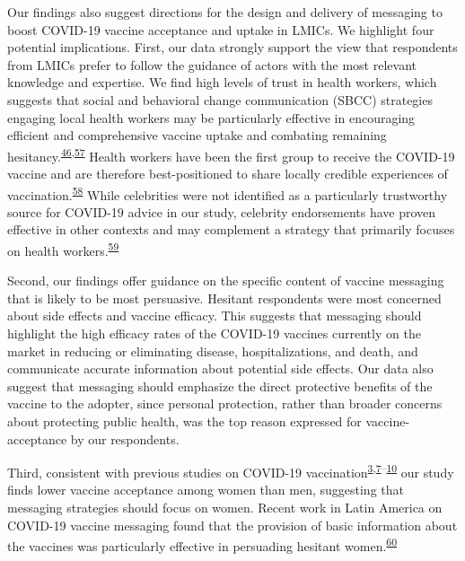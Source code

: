 \documentclass[
  12pt,
]{article}
\begin{document}
Our findings also suggest directions for the design and delivery of messaging to boost COVID-19 vaccine acceptance and uptake in LMICs. We highlight four potential implications. First, our data strongly support the view that respondents from LMICs prefer to follow the guidance of actors with the most relevant knowledge and expertise. We find high levels of trust in health workers, which suggests that social and behavioral change communication (SBCC) strategies engaging local health workers may be particularly effective in encouraging efficient and comprehensive vaccine uptake and combating remaining hesitancy.\textsuperscript{\protect\hyperlink{ref-bokemper2021timing}{46},\protect\hyperlink{ref-who2020behavioral}{57}} Health workers have been the first group to receive the COVID-19 vaccine and are therefore best-positioned to share locally credible experiences of vaccination.\textsuperscript{\protect\hyperlink{ref-katzman2021primary}{58}} While celebrities were not identified as a particularly trustworthy source for COVID-19 advice in our study, celebrity endorsements have proven effective in other contexts and may complement a strategy that primarily focuses on health workers.\textsuperscript{\protect\hyperlink{ref-alatas2019celebrities}{59}}

Second, our findings offer guidance on the specific content of vaccine messaging that is likely to be most persuasive. Hesitant respondents were most concerned about side effects and vaccine efficacy. This suggests that messaging should highlight the high efficacy rates of the COVID-19 vaccines currently on the market in reducing or eliminating disease, hospitalizations, and death, and communicate accurate information about potential side effects. Our data also suggest that messaging should emphasize the direct protective benefits of the vaccine to the adopter, since personal protection, rather than broader concerns about protecting public health, was the top reason expressed for vaccine-acceptance by our respondents.

Third, consistent with previous studies on COVID-19 vaccination\textsuperscript{\protect\hyperlink{ref-wouters2021challenges}{3},\protect\hyperlink{ref-kreps2020factors}{7}--\protect\hyperlink{ref-fisher2020attitudes}{10}} our study finds lower vaccine acceptance among women than men, suggesting that messaging strategies should focus on women. Recent work in Latin America on COVID-19 vaccine messaging found that the provision of basic information about the vaccines was particularly effective in persuading hesitant women.\textsuperscript{\protect\hyperlink{ref-argote2021messaging}{60}}
\end{document}
